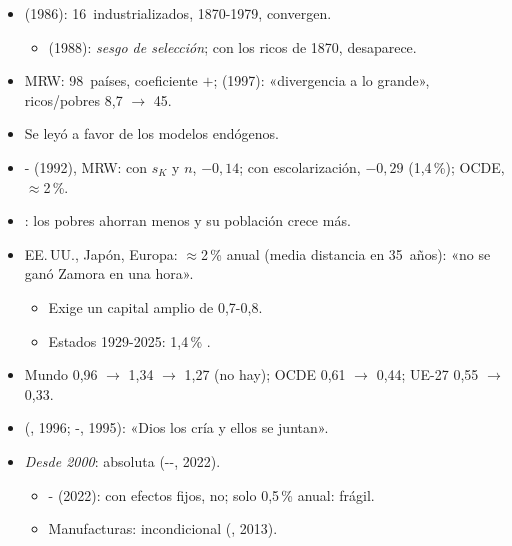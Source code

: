 \documentclass{article}
\begin{document}
\begin{columnas}
\begin{itemize}
\item {} (1986): 16~industrializados, 1870-1979, convergen.
  \begin{itemize}
  \item {} (1988): \emph{sesgo de selección}; con los ricos de 1870, desaparece.
  \end{itemize}
\item MRW: 98~países, coeficiente $+$;  (1997): «divergencia a lo grande», ricos/pobres 8,7 $\to$ 45.
\item Se leyó a favor de los modelos endógenos.
\end{itemize}
\begin{itemize}
\item {}- (1992), MRW: con $s_K$ y $n$, $-0{,}14$; con escolarización, $-0{,}29$ (1,4\,\%); OCDE, $\approx$2\,\%.
\item {}: los pobres ahorran menos y su población crece más.
\end{itemize}
\begin{itemize}
\item EE.\,UU., Japón, Europa: $\approx$2\,\% anual (media distancia en 35~años): «no se ganó Zamora en una hora».
  \begin{itemize}
  \item Exige un capital amplio de 0,7-0,8.
  \item Estados 1929-2025: 1,4\,\% .
  \end{itemize}
\end{itemize}
\begin{itemize}
\item Mundo 0,96 $\to$ 1,34 $\to$ 1,27 (no hay); OCDE 0,61 $\to$ 0,44; UE-27 0,55 $\to$ 0,33.
\end{itemize}
\begin{itemize}
\item {} (, 1996; -, 1995): «Dios los cría y ellos se juntan».
\item \emph{Desde 2000}: absoluta (--, 2022).
  \begin{itemize}
  \item {}- (2022): con efectos fijos, no; solo 0,5\,\% anual: frágil.
  \item Manufacturas: incondicional (, 2013).
  \end{itemize}
\end{itemize}


\end{columnas}
\end{document}
